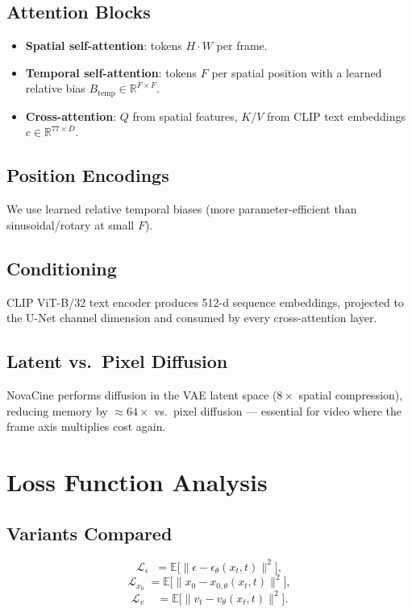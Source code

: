 \documentclass[conference]{IEEEtran}
\begin{document}
\subsection{Attention Blocks}
\begin{itemize}
  \item \textbf{Spatial self-attention}: tokens $H\!\cdot\!W$ per frame.
  \item \textbf{Temporal self-attention}: tokens $F$ per spatial position
        with a learned relative bias $B_{\text{temp}}\in\mathbb{R}^{F\times F}$.
  \item \textbf{Cross-attention}: $Q$ from spatial features, $K$/$V$
        from CLIP text embeddings $c\in\mathbb{R}^{77\times D}$.
\end{itemize}

\subsection{Position Encodings}
We use learned relative temporal biases (more parameter-efficient
than sinusoidal/rotary at small $F$).

\subsection{Conditioning}
CLIP ViT-B/32 text encoder produces 512-d sequence embeddings,
projected to the U-Net channel dimension and consumed by every
cross-attention layer.

\subsection{Latent vs.\ Pixel Diffusion}
NovaCine performs diffusion in the VAE latent space ($8\times$
spatial compression), reducing memory by $\approx 64\times$ vs.\
pixel diffusion --- essential for video where the frame axis
multiplies cost again.

\section{Loss Function Analysis}

\subsection{Variants Compared}
\begin{equation}
\mathcal{L}_{\epsilon}\;\;= \mathbb{E}\big[\|\epsilon - \epsilon_\theta(x_t,t)\|^2\big],
\end{equation}
\begin{equation}
\mathcal{L}_{x_0}\;= \mathbb{E}\big[\|x_0 - x_{0,\theta}(x_t,t)\|^2\big],
\end{equation}
\begin{equation}
\mathcal{L}_{v}\;\;\;\;= \mathbb{E}\big[\|v_t - v_\theta(x_t,t)\|^2\big].
\end{equation}
\end{document}
